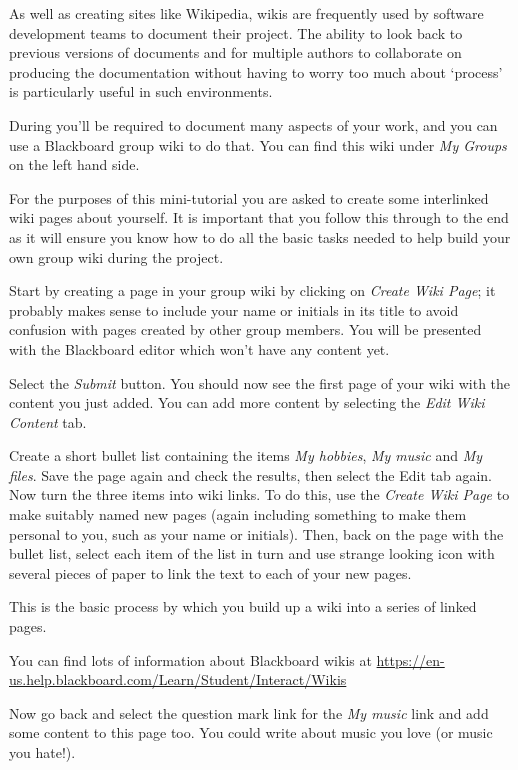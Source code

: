 \begin{firstonly}
As well as creating sites like Wikipedia, wikis are frequently used by
software development teams to document their project. The ability to
look back to previous versions of documents and for multiple authors
to collaborate on producing the documentation without having to worry
too much about `process' is particularly useful in such environments.

During  you'll be required to document many
aspects of your work, and you can use a Blackboard group wiki to do that. You
can find this wiki under \emph{My Groups} on the left hand side.

For the purposes of this mini-tutorial you are asked to create some
interlinked wiki pages about yourself. It is important that you follow
this through to the end as it will ensure you know how to do all the
basic tasks needed to help build your own group wiki during the
project.

Start by creating a page in your group wiki by clicking on
\emph{Create Wiki Page}; it probably makes sense to include your name
or initials in its title to avoid confusion with pages created by
other group members. You will be presented with the Blackboard editor
which won't have any content yet.

Select the \emph{Submit} button. You should now see the first page of
your wiki with the content you just added. You can add more content by
selecting the \emph{Edit Wiki Content} tab.

Create a short bullet list containing the items \emph{My hobbies},
\emph{My music} and \emph{My files}.  Save the page again and check
the results, then select the Edit tab again. Now turn the three items
into wiki links. To do this, use the \emph{Create Wiki Page} to make
suitably named new pages (again including something to make them
personal to you, such as your name or initials). Then, back on the
page with the bullet list, select each item of the list in turn and
use strange looking icon with several pieces of paper to link the text
to each of your new pages.

This is the basic process by which you build up a wiki into a series
of linked pages.

You can find lots of information about Blackboard wikis at
{\small\url{https://en-us.help.blackboard.com/Learn/Student/Interact/Wikis}}

Now go back and select the question mark link for the \emph{My music}
link and add some content to this page too. You could write about
music you love (or music you hate!).


\end{firstonly}
